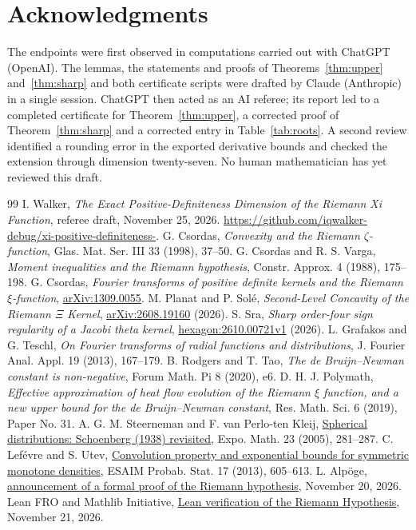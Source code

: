 \documentclass[11pt]{article}
\theoremstyle{remark}
\begin{document}
\section*{Acknowledgments}
The endpoints were first observed in computations carried out with ChatGPT (OpenAI). The
lemmas, the statements and proofs of Theorems~\ref{thm:upper} and~\ref{thm:sharp} and both
certificate scripts were drafted by Claude (Anthropic) in a single session. ChatGPT then acted as
an AI referee; its report led to a completed certificate for Theorem~\ref{thm:upper}, a corrected
proof of Theorem~\ref{thm:sharp} and a corrected entry in Table~\ref{tab:roots}. A second review identified a rounding error in the
exported derivative bounds and checked the extension through dimension twenty-seven. No human
mathematician has yet reviewed this draft.

\begin{thebibliography}{99}
 I. Walker, \emph{The Exact Positive-Definiteness Dimension of the Riemann Xi
Function}, referee draft, November 25, 2026.
\url{https://github.com/iqwalker-debug/xi-positive-definiteness-}.
 G. Csordas, \emph{Convexity and the Riemann $\zeta$-function}, Glas. Mat.
Ser. III 33 (1998), 37--50.
 G. Csordas and R. S. Varga, \emph{Moment inequalities and the Riemann
hypothesis}, Constr. Approx. 4 (1988), 175--198.
 G. Csordas, \emph{Fourier transforms of positive definite kernels and the
Riemann $\xi$-function}, \href{https://arxiv.org/abs/1309.0055}{arXiv:1309.0055}.
 M. Planat and P. Sol\'e, \emph{Second-Level Concavity of the
Riemann $\Xi$ Kernel}, \href{https://arxiv.org/abs/2608.19160}{arXiv:2608.19160} (2026).
 S. Sra, \emph{Sharp order-four sign regularity of a Jacobi theta kernel},
\href{https://hexagonmath.org/pdf/2610.00721v1}{hexagon:2610.00721v1} (2026).
 L. Grafakos and G. Teschl, \emph{On Fourier transforms of radial functions and
distributions}, J. Fourier Anal. Appl. 19 (2013), 167--179.
 B. Rodgers and T. Tao, \emph{The de Bruijn--Newman constant is non-negative},
Forum Math. Pi 8 (2020), e6.
 D. H. J. Polymath, \emph{Effective approximation of heat flow evolution of the
Riemann $\xi$ function, and a new upper bound for the de Bruijn--Newman constant},
Res. Math. Sci. 6 (2019), Paper No. 31.
 A. G. M. Steerneman and F. van Perlo-ten Kleij,
\href{https://doi.org/10.1016/j.exmath.2005.01.002}{Spherical distributions: Schoenberg (1938) revisited},
Expo. Math. 23 (2005), 281--287.
 C. Lef\'evre and S. Utev,
\href{https://doi.org/10.1051/ps/2012012}{Convolution property and exponential bounds for symmetric monotone densities},
ESAIM Probab. Stat. 17 (2013), 605--613.
 L. Alp\"oge, \href{https://alpo.ge/remark.pdf}{announcement of a formal proof of the Riemann hypothesis}, November 20, 2026.
 Lean FRO and Mathlib Initiative, \href{https://leanprover-community.github.io/blog/posts/riemann-hypothesis/}{Lean verification of the Riemann Hypothesis}, November 21, 2026.
\end{thebibliography}
\end{document}
